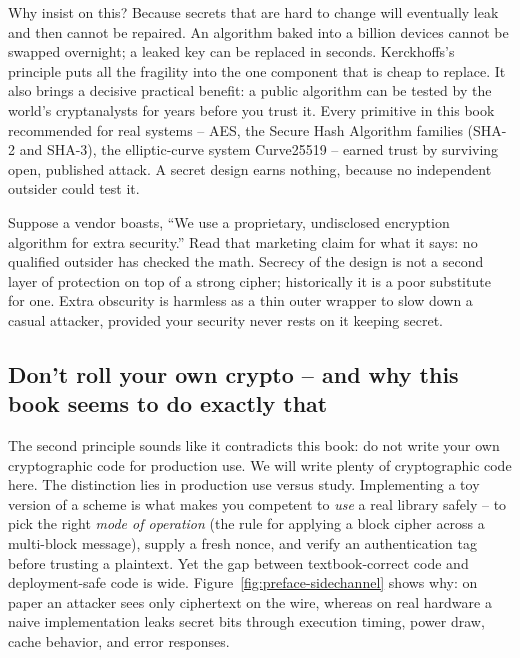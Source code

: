 \begin{whybox}
Why insist on this? Because secrets that are hard to change will eventually leak and then cannot be repaired. An algorithm baked into a billion devices cannot be swapped overnight; a leaked key can be replaced in seconds. Kerckhoffs's principle puts all the fragility into the one component that is cheap to replace. It also brings a decisive practical benefit: a public algorithm can be tested by the world's cryptanalysts for years before you trust it. Every primitive in this book recommended for real systems -- AES, the Secure Hash Algorithm families (SHA-2 and SHA-3), the elliptic-curve system Curve25519 -- earned trust by surviving open, published attack. A secret design earns nothing, because no independent outsider could test it.
\end{whybox}

\begin{trapbox}
Suppose a vendor boasts, ``We use a proprietary, undisclosed encryption algorithm for extra security.'' Read that marketing claim for what it says: no qualified outsider has checked the math. Secrecy of the design is not a second layer of protection on top of a strong cipher; historically it is a poor substitute for one. Extra obscurity is harmless as a thin outer wrapper to slow down a casual attacker, provided your security never rests on it keeping secret.
\end{trapbox}

\subsection*{Don't roll your own crypto -- and why this book seems to do exactly that}

The second principle sounds like it contradicts this book: do not write your own cryptographic code for production use. We will write plenty of cryptographic code here. The distinction lies in production use versus study. Implementing a toy version of a scheme is what makes you competent to \emph{use} a real library safely -- to pick the right \emph{mode of operation} (the rule for applying a block cipher across a multi-block message), supply a fresh nonce, and verify an authentication tag before trusting a plaintext. Yet the gap between textbook-correct code and deployment-safe code is wide. Figure~\ref{fig:preface-sidechannel} shows why: on paper an attacker sees only ciphertext on the wire, whereas on real hardware a naive implementation leaks secret bits through execution timing, power draw, cache behavior, and error responses.

